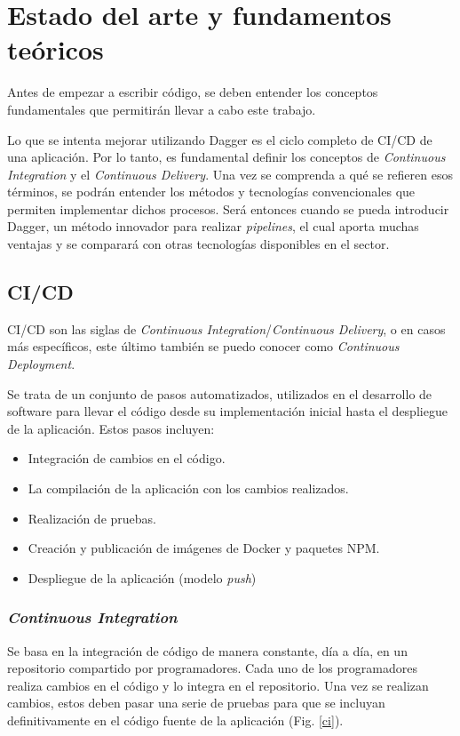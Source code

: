 \chapter{Estado del arte y fundamentos teóricos}

Antes de empezar a escribir código, se deben entender los conceptos fundamentales que permitirán llevar a cabo este trabajo.

Lo que se intenta mejorar utilizando Dagger es el ciclo completo de CI/CD de una aplicación. Por lo tanto, es fundamental definir los conceptos de \textit{Continuous Integration} y el \textit{Continuous Delivery}. Una vez se comprenda a qué se refieren esos términos, se podrán entender los métodos y tecnologías convencionales que permiten implementar dichos procesos. Será entonces cuando se pueda introducir Dagger, un método innovador para realizar \textit{pipelines}, el cual aporta muchas ventajas y se comparará con otras tecnologías disponibles en el sector.

\section{CI/CD}

CI/CD son las siglas de \textit{Continuous Integration}/\textit{Continuous Delivery}, o en casos más específicos, este último también se puedo conocer como \textit{Continuous Deployment}.

Se trata de un conjunto de pasos automatizados, utilizados en el desarrollo de software para llevar el código desde su implementación inicial hasta el despliegue de la aplicación. Estos pasos incluyen:

\begin{itemize}
  \item Integración de cambios en el código.
  \item La compilación de la aplicación con los cambios realizados.
  \item Realización de pruebas.
  \item Creación y publicación de imágenes de Docker y paquetes NPM.
  \item Despliegue de la aplicación (modelo \textit{push}\cite{push})
\end{itemize}

\subsection*{\textit{Continuous Integration}}

Se basa en la integración de código de manera constante, día a día, en un repositorio compartido por programadores. Cada uno de los programadores realiza cambios en el código y lo integra en el repositorio. Una vez se realizan cambios, estos deben pasar una serie de pruebas para que se incluyan definitivamente en el código fuente de la aplicación (Fig. \ref{ci}).

